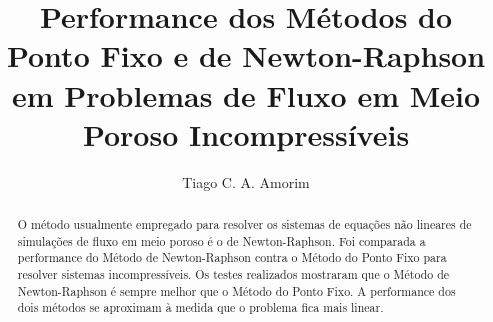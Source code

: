 \documentclass[final,5p]{elsarticle}
\numberwithin{equation}{section}
\begin{document}
\begin{frontmatter}



\title{Performance dos Métodos do Ponto Fixo e de Newton-Raphson em Problemas de Fluxo em Meio Poroso Incompressíveis}


\author{Tiago C. A. Amorim}

\begin{abstract}

    O método usualmente empregado para resolver os sistemas de equações não lineares de simulações de fluxo em meio poroso é o de Newton-Raphson. Foi comparada a performance do Método de Newton-Raphson contra o Método do Ponto Fixo para resolver sistemas incompressíveis. Os testes realizados mostraram que o Método de Newton-Raphson é sempre melhor que o Método do Ponto Fixo. A performance dos dois métodos se aproximam à medida que o problema fica mais linear.


\end{abstract}
\end{frontmatter}
\end{document}

